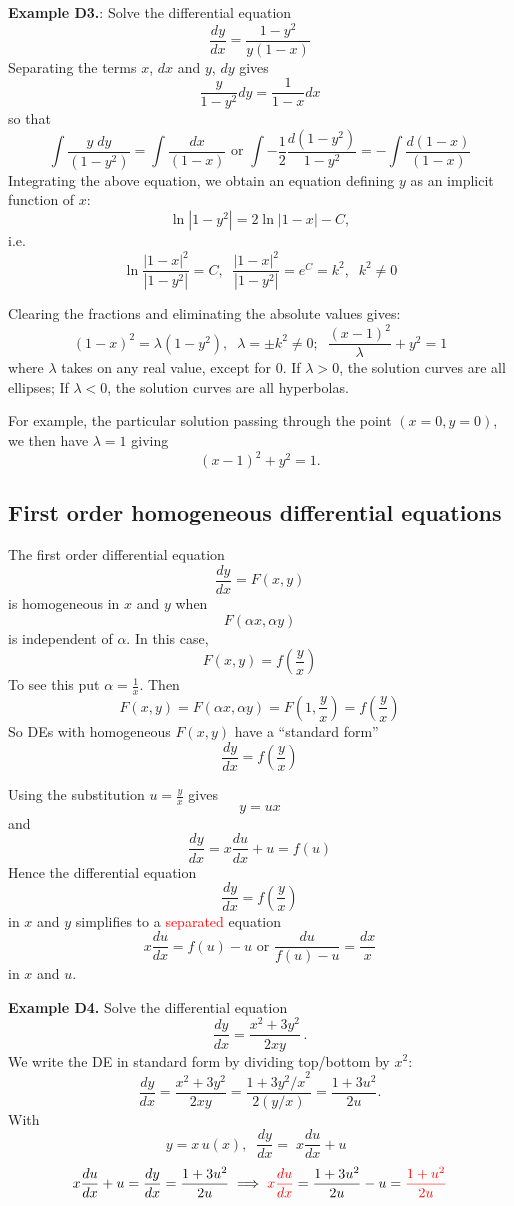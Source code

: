\documentclass{article}
\begin{document}
\hrulefill

\textbf{Example D3.}: Solve the differential equation
$$
\frac{dy}{dx} = \frac{1-y^2}{y(1-x)}
$$
Separating the terms $x$, $dx$ and $y$, $dy$ gives
$$
\frac{y}{1-y^2} dy = \frac{1}{1-x} dx
$$
so that
$$
\int \frac{ y \; dy}{(1-y^2)}= \int \frac{dx}{(1-x)} \mbox{ or } \int - \frac{1}{2}\frac{d(1-y^2)}{1-y^2}= -\int \frac{d(1-x)}{(1-x)}
$$
Integrating the above equation, we obtain an equation defining $y$
as an implicit function of $x$:
$$
\ln |1-y^2|= 2 \ln |1-x| -C,
$$
i.e.
$$
\ln \frac{|1-x|^2}{|1-y^2|}= C, \;\;
\frac{|1-x|^2}{|1-y^2|}=e^C=k^2, \;\; k^2 \ne 0
$$


Clearing the fractions and eliminating the absolute values gives:
$$
(1-x)^2 = \lambda  (1-y^2),  \;\; \lambda= \pm k^2 \ne 0; \;\;
\frac{(x-1)^2}{\lambda}+y^2=1
$$
where $\lambda$ takes on any real value, except for $0$. If $
\lambda >0$, the solution curves are all ellipses; If $ \lambda
<0$, the solution curves are all hyperbolas.

For example, the particular solution passing through the point $(x=0,
y=0)$, we then have $ \lambda=1$ giving
$$
(x-1)^2+y^2=1.
$$


\subsection{First order homogeneous differential equations}


The first order differential equation
$$
\frac{dy}{dx} = F(x,y)
$$
is homogeneous in $x$ and $y$ when
$$
F(\alpha x, \alpha y)
$$ 
is independent of $\alpha$. In this case,
$$
F(x,y) = f\left( \frac{y}{x}\right) 
$$
To see this put $\alpha = \frac{1}{x}$. Then
$$
F(x,y) = F(\alpha x, \alpha y) = F\left( 1,\frac{y}{x}\right)  = f\left( \frac{y}{x}\right)   
$$
So DEs with homogeneous $F(x,y)$ have a ``standard form''
$$
\frac{d y}{dx} = f\left( \frac{y}{x}\right) 
$$


Using the substitution $u = \frac{y}{x}$ gives 
$$
y = u x
$$ 
and 
$$
\frac{d y}{dx} = x \frac{du}{dx} + u = f(u)
$$
Hence the differential equation 
$$
\frac{d y}{dx} = f(\frac{y}{x})
$$
in $x$ and $y$ simplifies to a \textcolor{red}{separated} equation
$$
x \frac{du}{dx} = f(u) - u \mbox{ or } \frac{du}{f(u) - u} = \frac{dx}{x}
$$
in $x$ and $u$.

\hrulefill

\textbf{Example D4.} Solve the differential equation
$$
\frac{dy}{dx} = \frac{x^2 +3 y^2}{2 xy}\,.
$$
We write the DE in standard form by dividing top/bottom by $x^2$:
$$
\frac{dy}{dx}= \frac{x^2 +3 y^2}{ 2 xy }= \frac{1 +3 {y^2/x}^2}{ 2 (y/x)} = \frac{1 +3 {u}^2}{ 2u} .
$$
With
$$
y=x\, u(x), \; \; \frac{d y}{d x}= \; x\frac{d u}{d x}+u \;\; %
$$
$$
x\frac{d u}{d x}+ u = \frac{dy}{dx} = \frac{1 + 3 u^2}{ 2u} \implies 
\textcolor{red}{x \frac{d u}{dx}} = \frac{1 + 3 u^2}{ 2u} - u= \textcolor{red}{\frac{1 +  u^2}{ 2u}}
$$
\end{document}
